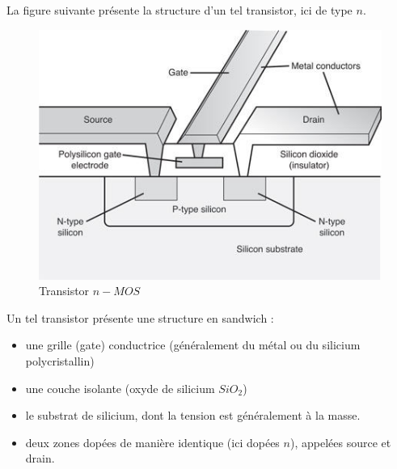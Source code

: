 

La figure suivante présente la structure d'un tel transistor, ici de type $n$.

\begin{figure}[htb]
\begin{center}
\includegraphics[scale=0.6]{figures/n-MOS_2.png}
\caption{Transistor $n-MOS$}
\end{center}
\end{figure}

Un tel transistor présente une structure en sandwich :
\begin{itemize}
\item une grille (gate) conductrice (généralement du métal ou du silicium polycristallin)
\item une couche isolante (oxyde de silicium $SiO_2$)
\item le substrat de silicium, dont la tension est généralement à la masse.
\item deux zones dopées de manière identique (ici dopées $n$), appelées source et drain.
\end{itemize}

